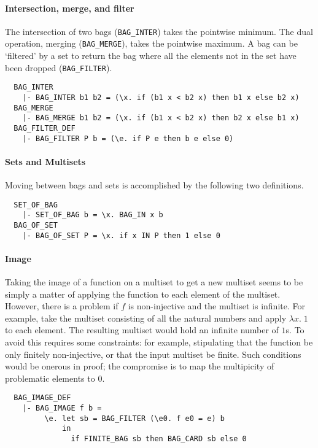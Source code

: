 \paragraph {Intersection, merge, and filter}

The intersection of two bags ({\small\verb+BAG_INTER+}) takes the
pointwise minimum. The dual operation, merging
({\small\verb+BAG_MERGE+}), takes the pointwise maximum. A bag can be
`filtered' by a set to return the bag where all the elements not in
the set have been dropped ({\small\verb+BAG_FILTER+}).
%
{\small
\begin{verbatim}
  BAG_INTER
    |- BAG_INTER b1 b2 = (\x. if (b1 x < b2 x) then b1 x else b2 x)
  BAG_MERGE
    |- BAG_MERGE b1 b2 = (\x. if (b1 x < b2 x) then b2 x else b1 x)
  BAG_FILTER_DEF
    |- BAG_FILTER P b = (\e. if P e then b e else 0)
\end{verbatim}
}

\paragraph {Sets and Multisets}

Moving between bags and sets is accomplished by the following two
definitions.
%
{\small
\begin{verbatim}
  SET_OF_BAG
    |- SET_OF_BAG b = \x. BAG_IN x b
  BAG_OF_SET
    |- BAG_OF_SET P = \x. if x IN P then 1 else 0
\end{verbatim}
}

\paragraph {Image}

Taking the image of a function on a multiset
to get a new multiset seems to be simply a
matter of applying the function to each element of the multiset. However, there
is a problem if $f$ is non-injective and the multiset is infinite. For
example, take the multiset consisting of all the natural numbers and
apply $\lambda x.\; 1$ to each element. The resulting multiset would hold an
infinite number of $1$s. To avoid this requires some constraints: for
example, stipulating that the function be only finitely non-injective,
or that the input multiset be finite. Such conditions would be onerous
in proof; the compromise is to map the multipicity of problematic
elements to $0$.
%
{\small
\begin{verbatim}
  BAG_IMAGE_DEF
    |- BAG_IMAGE f b =
         \e. let sb = BAG_FILTER (\e0. f e0 = e) b
             in
               if FINITE_BAG sb then BAG_CARD sb else 0
\end{verbatim}
}


